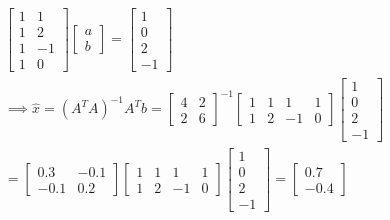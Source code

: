 \\
\begin{gather*}
    \begin{bmatrix}
        1 & 1\\
        1 & 2\\
        1 & -1\\
        1 & 0
    \end{bmatrix}
    \begin{bmatrix}
        a\\b
    \end{bmatrix}
    =
    \begin{bmatrix}
        1\\0\\2\\-1
    \end{bmatrix}
    \\\implies
    \hat{x} = (A^TA)^{-1} A^T b
    = \begin{bmatrix}
        4 & 2\\
        2 & 6
    \end{bmatrix}^{-1}
    \begin{bmatrix}
        1 & 1 & 1 & 1\\
        1 & 2 & -1 & 0
    \end{bmatrix}
    \begin{bmatrix}
        1\\0\\2\\-1
    \end{bmatrix}
    \\=
    \begin{bmatrix}
        0.3 & -0.1\\
        -0.1 & 0.2
    \end{bmatrix}
    \begin{bmatrix}
        1 & 1 & 1 & 1\\
        1 & 2 & -1 & 0
    \end{bmatrix}
    \begin{bmatrix}
        1\\0\\2\\-1
    \end{bmatrix}
    = \begin{bmatrix}
        0.7 \\ -0.4
    \end{bmatrix}

\end{gather*}
